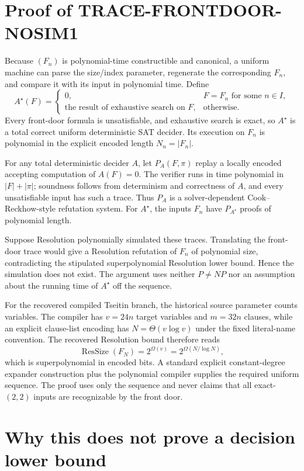 \documentclass[11pt]{article}
\newcommand{\ResSize}{\operatorname{ResSize}}
\begin{document}
\section{Proof of TRACE-FRONTDOOR-NOSIM1}

Because $(F_n)$ is polynomial-time constructible and canonical, a uniform
machine can parse the size/index parameter, regenerate the corresponding
$F_n$, and compare it with its input in polynomial time.  Define
\[
 A^\star(F)=
 \begin{cases}
   0,&F=F_n\text{ for some }n\in I,\\
   \text{the result of exhaustive search on }F,&\text{otherwise}.
 \end{cases}
\]
Every front-door formula is unsatisfiable, and exhaustive search is exact, so
$A^\star$ is a total correct uniform deterministic SAT decider.  Its execution
on $F_n$ is polynomial in the explicit encoded length $N_n=|F_n|$.

For any total deterministic decider $A$, let $P_A(F,\pi)$ replay a locally
encoded accepting computation of $A(F)=0$.  The verifier runs in time
polynomial in $|F|+|\pi|$; soundness follows from determinism and correctness
of $A$, and every unsatisfiable input has such a trace.  Thus $P_A$ is a
solver-dependent Cook--Reckhow-style refutation system.  For $A^\star$, the
inputs $F_n$ have $P_{A^\star}$ proofs of polynomial length.

Suppose Resolution polynomially simulated these traces.  Translating the
front-door trace would give a Resolution refutation of $F_n$ of polynomial
size, contradicting the stipulated superpolynomial Resolution lower bound.
Hence the simulation does not exist.  The argument uses neither $P\ne NP$ nor
an assumption about the running time of $A^\star$ off the sequence.

For the recovered compiled Tseitin branch, the historical source parameter
counts variables.  The compiler has $v=24n$ target variables and $m=32n$
clauses, while an explicit clause-list encoding has
$N=\Theta(v\log v)$ under the fixed literal-name convention.  The recovered
Resolution bound therefore reads
\[
  \ResSize(F_N)=2^{\Omega(v)}=2^{\Omega(N/\log N)},
\]
which is superpolynomial in encoded bits.  A standard explicit constant-degree
expander construction plus the polynomial compiler supplies the required
uniform sequence.  The proof uses only the sequence and never claims that all
exact-$(2,2)$ inputs are recognizable by the front door.

\section{Why this does not prove a decision lower bound}
\end{document}
